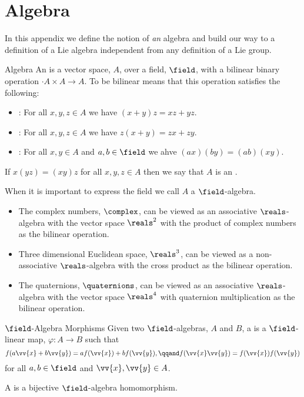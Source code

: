 \chapter{Algebra}
In this appendix we define the notion of \emph{an} algebra and build our way to a definition of a Lie algebra independent from any definition of a Lie group.

\begin{dfn}{Algebra}{}
    An  is a vector space, \(A\), over a field, \(\field\), with a bilinear binary operation \(\cdot A \times A \to A\).
    To be bilinear means that this operation satisfies the following:
    \begin{itemize}
        \item {}: For all \(x, y, z \in A\) we have \((x + y) z = xz + yz\).
        \item {}: For all \(x, y, z \in A\) we have \(z(x + y) = zx + zy\).
        \item {}: For all \(x, y \in A\) and \(a, b \in \field\) we ahve \((ax)(by) = (ab)(xy)\).
    \end{itemize}
    
    If \(x(yz) = (xy)z\) for all \(x, y, z \in A\) then we say that \(A\) is an .
\end{dfn}
When it is important to express the field we call \(A\) a \(\field\)-algebra.

\begin{exm}{}{}
    \begin{itemize}
        \item The complex numbers, \(\complex\), can be viewed as an associative \(\reals\)-algebra with the vector space \(\reals^2\) with the product of complex numbers as the bilinear operation.
        \item Three dimensional Euclidean space, \(\reals^3\), can be viewed as a non-associative \(\reals\)-algebra with the cross product as the bilinear operation.
        \item The quaternions, \(\quaternions\), can be viewed as an associative \(\reals\)-algebra with the vector space \(\reals^4\) with quaternion multiplication as the bilinear operation.
    \end{itemize}
\end{exm}

\begin{dfn}{\(\field\)-Algebra Morphisms}{}
    Given two \(\field\)-algebras, \(A\) and \(B\), a  is a \(\field\)-linear map, \(\varphi\colon A \to B\) such that
    \begin{equation}
        f(a\vv{x} + b\vv{y}) = af(\vv{x}) + bf(\vv{y}), \qqand f(\vv{x}\vv{y}) = f(\vv{x})f(\vv{y})
    \end{equation}
    for all \(a, b \in \field\) and \(\vv{x}, \vv{y} \in A\).
    
    A  is a bijective \(\field\)-algebra homomorphism.
\end{dfn}

